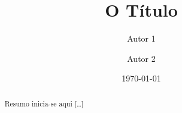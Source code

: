 \documentclass{article}
\title{O Título}
\author{Autor 1 \and Autor 2}
\date{\today}
\begin{document}
\maketitle

\begin{abstract}
  Resumo inicia-se aqui [\ldots]
\end{abstract}
\end{document}
